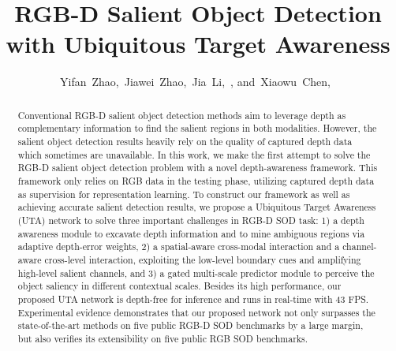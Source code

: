 \documentclass[journal]{IEEEtran}
\begin{document}
\title{RGB-D Salient Object Detection with Ubiquitous Target Awareness}

\author{Yifan~Zhao,~Jiawei~Zhao,~Jia~Li,~, and~Xiaowu~Chen,~}




\maketitle

\begin{abstract}
 Conventional RGB-D salient object detection methods aim to leverage depth as complementary information to find the salient regions in both modalities. However, the salient object detection results heavily rely on the quality of captured depth data which sometimes are unavailable. In this work, we make the first attempt to solve the RGB-D salient object detection problem with a novel depth-awareness framework. This framework only relies on RGB data in the testing phase, utilizing captured depth data as supervision for representation learning. To construct our framework as well as achieving accurate salient detection results, we propose a Ubiquitous Target Awareness (UTA) network to solve three important challenges in RGB-D SOD task: 1) a depth awareness module to excavate depth information and to mine ambiguous regions via adaptive depth-error weights, 2) a spatial-aware cross-modal interaction and a channel-aware cross-level interaction, exploiting the low-level boundary cues and amplifying high-level salient channels, and 3) a gated multi-scale predictor module to perceive the object saliency in different contextual scales. Besides its high performance, our proposed UTA network is depth-free for inference and runs in real-time with 43 FPS. Experimental evidence demonstrates that our proposed network not only surpasses the state-of-the-art methods on five public RGB-D SOD benchmarks by a large margin, but also verifies its extensibility on five public RGB SOD benchmarks.
 	
\end{abstract}
\end{document}
